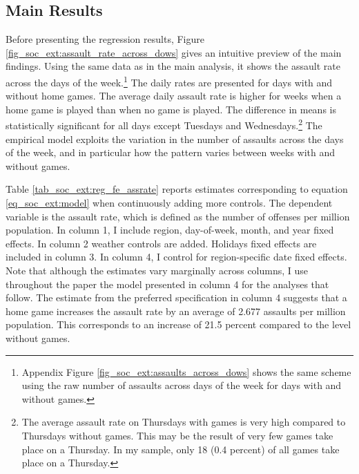 \subsection{Main Results}



Before presenting the regression results, Figure \ref{fig_soc_ext:assault_rate_across_dows} gives an intuitive preview of the main findings. Using the same data as in the main analysis, it shows the assault rate across the days of the week.\footnote{Appendix Figure \ref{fig_soc_ext:assaults_across_dows} shows the same scheme using the raw number of assaults across days of the week for days with and without games.} The daily rates are presented for days with and without home games. The average daily assault rate is higher for weeks when a home game is played than when no game is played. The difference in means is statistically significant for all days except Tuesdays and Wednesdays.\footnote{The average assault rate on Thursdays with games is very high compared to Thursdays without games. This may be the result of very few games take place on a Thursday. In my sample, only 18 (0.4 percent) of all games take place on a Thursday.} The empirical model exploits the variation in the number of assaults across the days of the week, and in particular how the pattern varies between weeks with and without games.




Table \ref{tab_soc_ext:reg_fe_assrate} reports estimates corresponding to equation \ref{eq_soc_ext:model} when continuously adding more controls. The dependent variable is the assault rate, which is defined as the number of offenses per million population. In column 1, I include region, day-of-week, month, and year fixed effects. In column 2 weather controls are added. Holidays fixed effects are included in column 3. In column 4, I control for region-specific date fixed effects. Note that although the estimates vary marginally across columns, I use throughout the paper the model presented in column 4 for the analyses that follow. The estimate from the preferred specification in column 4 suggests that a home game increases the assault rate by an average of 2.677 assaults per million population. This corresponds to an increase of 21.5 percent compared to the level without games.




